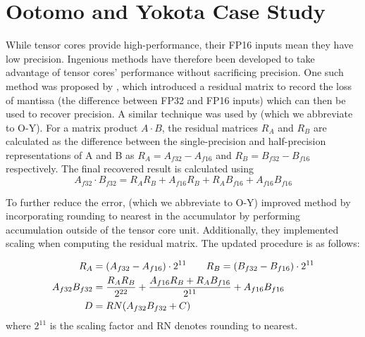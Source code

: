 \section{Ootomo and Yokota Case Study}\label{sec:ootomo-case-study}

While tensor cores provide high-performance, their FP16 inputs mean they have low precision. 
Ingenious methods have therefore been developed to take advantage of tensor cores' performance without sacrificing precision.
One such method was proposed by \citet{markidis}, which introduced a residual matrix to record the loss of mantissa (the difference between FP32 and FP16 inputs) which can then be used to recover precision. A similar technique was used by \citet{fasi2023matrix} (which we abbreviate to O-Y). For a matrix product $A\cdot B$, the residual matrices $R_A$ and $R_B$ are calculated as the difference between the single-precision and half-precision representations of A and B as $R_A = A_{f32} - A_{f16}$ and $R_B = B_{f32} - B_{f16}$ respectively. The final recovered result is calculated using 
\begin{equation*}
A_{f32}\cdot B_{f32} = R_AR_B + A_{f16}R_B + R_AB_{f16} + A_{f16}B_{f16}
\end{equation*}

To further reduce the error, \citet{ootomo2022recovering} (which we abbreviate to O-Y) improved \citeauthor{markidis} method by incorporating rounding to nearest in the accumulator by performing accumulation outside of the tensor core unit. Additionally, they implemented scaling when computing the residual matrix. The updated procedure is as follows:

\begin{align*}
R_A &= (A_{f32} - A_{f16}) \cdot 2^{11} \text{\hspace{2em}}
R_B = (B_{f32} - B_{f16}) \cdot 2^{11} \\
A_{f32} B_{f32} &= \frac{R_AR_B}{2^{22}} + \frac{A_{f16}R_B + R_AB_{f16}}{2^{11}} + A_{f16}B_{f16} \\
D &= RN(A_{f32}B_{f32} + C)
\end{align*}
where $2^{11}$ is the scaling factor and RN denotes rounding to nearest.

